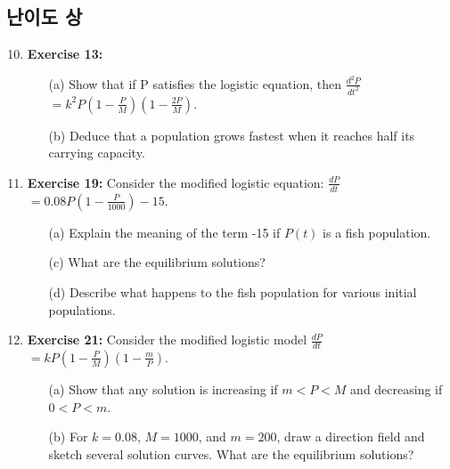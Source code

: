 \documentclass[12pt, a4paper]{article}
\begin{document}
\subsection*{난이도 상 }
\begin{enumerate}
    \setcounter{enumi}{9} %
    \item \textbf{Exercise 13:}
    \begin{itemize}
        \item[(a)] Show that if P satisfies the logistic equation, then {\large$\frac{d^2P}{dt^2}$} $=k^2P\left(1 - \frac{P}{M}\right)\left(1 - \frac{2P}{M}\right)$.
        \item[(b)] Deduce that a population grows fastest when it reaches half its carrying capacity.
    \end{itemize}

    \item \textbf{Exercise 19:} Consider the modified logistic equation: {\large$\frac{dP}{dt}$} $= 0.08P\left(1 - \frac{P}{1000}\right) - 15$.
    \begin{itemize}
        \item[(a)] Explain the meaning of the term -15 if $P(t)$ is a fish population.
        \item[(c)] What are the equilibrium solutions?
        \item[(d)] Describe what happens to the fish population for various initial populations.
    \end{itemize}

    \item \textbf{Exercise 21:} Consider the modified logistic model {\large$\frac{dP}{dt}$} $= kP\left(1 - \frac{P}{M}\right)\left(1 - \frac{m}{P}\right)$.
    \begin{itemize}
        \item[(a)] Show that any solution is increasing if $m < P < M$ and decreasing if $0 < P < m$.
        \item[(b)] For $k=0.08$, $M=1000$, and $m=200$, draw a direction field and sketch several solution curves. What are the equilibrium solutions?
    \end{itemize}
\end{enumerate}
\end{document}
